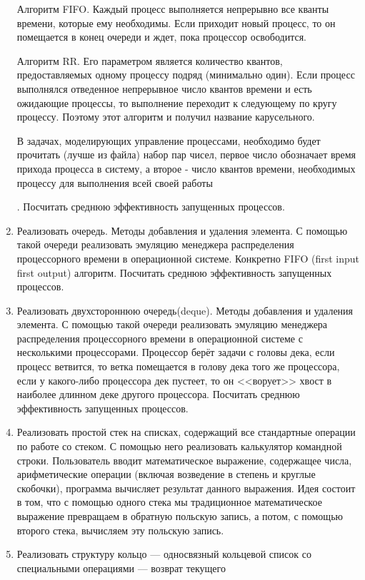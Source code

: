 \documentclass[12pt]{article}
\begin{document}
\begin{enumerate}
{ Алгоритм FIFO. Каждый процесс выполняется непрерывно все кванты времени, которые ему необходимы.
 Если приходит новый процесс, то он помещается в конец очереди и ждет, пока процессор освободится. 
 
 Алгоритм RR. Его параметром является количество квантов,
 предоставляемых одному процессу подряд (минимально один). Если процесс выполнялся отведенное непрерывное число квантов 
 времени и есть ожидающие процессы, то выполнение  переходит к следующему по кругу процессу. Поэтому этот алгоритм и 
 получил название карусельного. 
 
 В задачах, моделирующих управление процессами, необходимо будет прочитать
 (лучше из файла) набор пар чисел, первое число обозначает время прихода процесса в систему, а второе - число квантов 
 времени, необходимых процессу для выполнения всей своей  работы}\addtocounter{footnote}{-1}\addtocounter{Hfootnote}{-1}.
 Посчитать среднюю эффективность запущенных процессов.
 \item Реализовать очередь. Методы добавления  и удаления элемента. С помощью такой очереди реализовать эмуляцию 
 менеджера распределения процессорного времени в операционной системе. Конкретно FIFO (first input first output) 
 алгоритм\footnotemark. Посчитать среднюю эффективность запущенных процессов.
 \item Реализовать двухстороннюю очередь(deque). Методы добавления  и удаления элемента. С помощью такой очереди
 реализовать эмуляцию менеджера распределения процессорного времени в операционной системе с несколькими процессорами. 
 Процессор берёт задачи с головы дека, если процесс ветвится, то ветка помещается в голову дека того же процессора, 
 если у какого-либо процессора дек пустеет, то он <<ворует>> хвост в наиболее длинном деке другого процессора. Посчитать
 среднюю эффективность запущенных процессов. 
 \item Реализовать простой стек на списках, содержащий все стандартные операции по работе со стеком. С помощью него 
 реализовать калькулятор командной строки. Пользователь вводит математическое выражение, содержащее числа, 
 арифметические операции (включая возведение в степень и круглые скобочки), программа вычисляет результат данного
 выражения. Идея состоит в том, что с помощью одного стека мы традиционное математическое выражение превращаем 
 в обратную польскую  запись, а потом, с помощью второго стека, вычисляем эту польскую запись. 
 \item Реализовать структуру кольцо --- односвязный кольцевой список со специальными операциями --- возврат текущего 

\end{enumerate}
\end{document}
